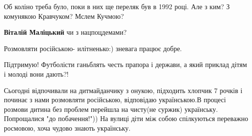 \begin{itemize}
 

Об коліно треба було, поки в них ще переляк був в 1992 році. Але з ким? З
комунякою Кравчуком? Мслем Кучмою?

\begin{itemize}
 
\textbf{Віталій Маліцький} чи з нацпоцдемами?
\end{itemize}

 
Розмовляти російською- илітненько:) зневага працює добре.

 
Підтримую! Футболісти ганьблять честь прапора і держави, а який приклад дітям і молоді вони дають?!

 

Сьогодні відпочивали на дитмайданчику з онукою, підходить хлопчик 7 рочків і
починає з нами розмовляти російською, відповідаю українською.В процесі розмови
дитина без проблем перейшла на чисту(не суржик) українську. Попрощалися "до
побачення!")) На вулиці діти між собою спілкуються переважно росмовою, хоча
чудово знають українську.

\begin{itemize}
 

\end{itemize}
\end{itemize}
